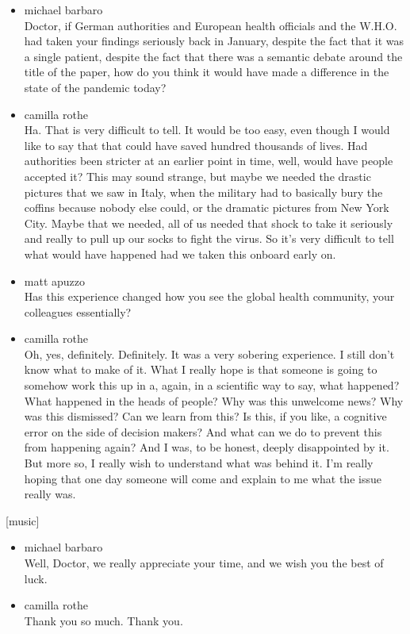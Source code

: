 \begin{itemize}
\item
  michael barbaro\\
  Doctor, if German authorities and European health officials and the
  W.H.O. had taken your findings seriously back in January, despite the
  fact that it was a single patient, despite the fact that there was a
  semantic debate around the title of the paper, how do you think it
  would have made a difference in the state of the pandemic today?
\item
  camilla rothe\\
  Ha. That is very difficult to tell. It would be too easy, even though
  I would like to say that that could have saved hundred thousands of
  lives. Had authorities been stricter at an earlier point in time,
  well, would have people accepted it? This may sound strange, but maybe
  we needed the drastic pictures that we saw in Italy, when the military
  had to basically bury the coffins because nobody else could, or the
  dramatic pictures from New York City. Maybe that we needed, all of us
  needed that shock to take it seriously and really to pull up our socks
  to fight the virus. So it's very difficult to tell what would have
  happened had we taken this onboard early on.
\item
  matt apuzzo\\
  Has this experience changed how you see the global health community,
  your colleagues essentially?
\item
  camilla rothe\\
  Oh, yes, definitely. Definitely. It was a very sobering experience. I
  still don't know what to make of it. What I really hope is that
  someone is going to somehow work this up in a, again, in a scientific
  way to say, what happened? What happened in the heads of people? Why
  was this unwelcome news? Why was this dismissed? Can we learn from
  this? Is this, if you like, a cognitive error on the side of decision
  makers? And what can we do to prevent this from happening again? And I
  was, to be honest, deeply disappointed by it. But more so, I really
  wish to understand what was behind it. I'm really hoping that one day
  someone will come and explain to me what the issue really was.
\end{itemize}

{[}music{]}

\begin{itemize}
\item
  michael barbaro\\
  Well, Doctor, we really appreciate your time, and we wish you the best
  of luck.
\item
  camilla rothe\\
  Thank you so much. Thank you.
\end{itemize}

